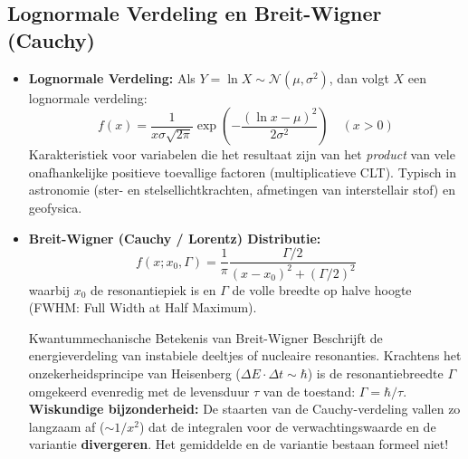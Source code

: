 \documentclass[11pt,a4paper]{article}
\newcommand{\normdist}{\mathcal{N}}
\begin{document}
\subsection{Lognormale Verdeling en Breit-Wigner (Cauchy)}
\begin{itemize}[leftmargin=1.5em]
    \item \textbf{Lognormale Verdeling:}
    Als $Y = \ln X \sim \normdist(\mu, \sigma^2)$, dan volgt $X$ een lognormale verdeling:
    \begin{equation}
        f(x) = \frac{1}{x \sigma \sqrt{2\pi}} \exp\left( -\frac{(\ln x - \mu)^2}{2\sigma^2} \right) \quad (x > 0)
    \end{equation}
    Karakteristiek voor variabelen die het resultaat zijn van het \emph{product} van vele onafhankelijke positieve toevallige factoren (multiplicatieve CLT). Typisch in astronomie (ster- en stelsellichtkrachten, afmetingen van interstellair stof) en geofysica.
    \item \textbf{Breit-Wigner (Cauchy / Lorentz) Distributie:}
    \begin{equation}
        f(x; x_0, \Gamma) = \frac{1}{\pi} \frac{\Gamma / 2}{(x - x_0)^2 + (\Gamma / 2)^2}
    \end{equation}
    waarbij $x_0$ de resonantiepiek is en $\Gamma$ de volle breedte op halve hoogte (FWHM: Full Width at Half Maximum).
    \begin{fysicabox}{Kwantummechanische Betekenis van Breit-Wigner}
    Beschrijft de energieverdeling van instabiele deeltjes of nucleaire resonanties. Krachtens het onzekerheidsprincipe van Heisenberg ($\Delta E \cdot \Delta t \sim \hbar$) is de resonantiebreedte $\Gamma$ omgekeerd evenredig met de levensduur $\tau$ van de toestand: $\Gamma = \hbar / \tau$.
    \textbf{Wiskundige bijzonderheid:} De staarten van de Cauchy-verdeling vallen zo langzaam af ($\sim 1/x^2$) dat de integralen voor de verwachtingswaarde en de variantie \textbf{divergeren}. Het gemiddelde en de variantie bestaan formeel niet!
    \end{fysicabox}
\end{itemize}
\end{document}
